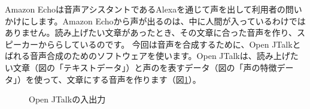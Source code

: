 \documentclass[text06.tex]{subfiles}
\begin{document}
Amazon Echoは音声アシスタントであるAlexaを通じて声を出して利用者の問いかけにします。Amazon Echoから声が出るのは、中に人間が入っているわけではありません。読み上げたい文章があったとき、その文章に合った音声を作り、スピーカーかららしているのです。
今回は音声を合成するために、Open JTalkとばれる音声合成のためのソフトウェアを使います。Open JTalkは、読み上げたい文章（図の「テキストデータ」）と声のを表すデータ（図の「声の特徴データ」）を使って、文章にする音声を作ります（図\ref{OpenJTalkの入出力}）。

\begin{figure}[H]
\begin{center}
    
    \caption{Open JTalkの入出力}
    \label{OpenJTalkの入出力}
\end{center}
\end{figure}

\begin{tcolorbox}[title=\useOmetoi]
\begin{enumerate}
\end{enumerate}
\end{tcolorbox}
\end{document}
